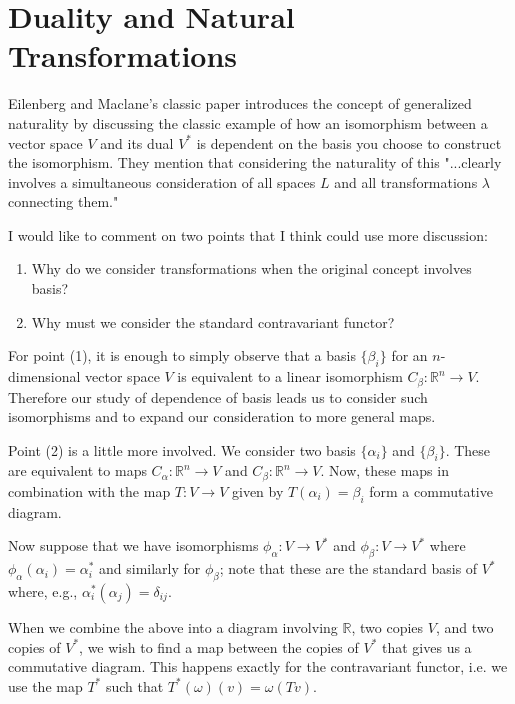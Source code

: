\section{Duality and Natural Transformations}

Eilenberg and Maclane's classic paper introduces the concept of generalized naturality by discussing 
the classic example of how an isomorphism between a vector space \(V\) and its dual \(V^*\) is dependent on
the basis you choose to construct the isomorphism. They mention that considering the naturality of this 
"...clearly involves a simultaneous consideration of all spaces \(L\) and all transformations \(\lambda\)
connecting them."

I would like to comment on two points that I think could use more discussion:
\begin{enumerate}
\item Why do we consider transformations when the original concept involves basis?
\item Why must we consider the standard contravariant functor?
\end{enumerate}

For point (1), it is enough to simply observe that a basis \(\{\beta_i\}\) for an \(n\)-dimensional vector space \(V\) is
equivalent to a linear isomorphism \(C_\beta: \mathbb R^n \to V\). Therefore our study of dependence of basis
leads us to consider such isomorphisms and to expand our consideration to more general maps.

Point (2) is a little more involved. We consider two basis \(\{\alpha_i\}\) and \(\{\beta_i\}\). These are 
equivalent to maps \(C_\alpha : \mathbb R^n \to V\) and \(C_\beta : \mathbb R^n \to V\). Now, these maps
in combination with the map \(T : V \to V\) given by \(T(\alpha_i) = \beta_i\) form a commutative diagram.

Now suppose that we have isomorphisms \(\phi_\alpha : V \to V^*\) and \(\phi_\beta : V \to V^*\) 
where \(\phi_\alpha(\alpha_i) = \alpha_i^*\) and similarly for \(\phi_\beta\); note that these
are the standard basis of \(V^*\) where, e.g., \(\alpha^*_i(\alpha_j) = \delta_{ij}\).

When we combine the above into a diagram involving \(\mathbb R\), two copies \(V\), and two copies of \(V^*\),
we wish to find a map between the copies of \(V^*\) that gives us a commutative diagram. This happens
exactly for the contravariant functor, i.e. we use the map \(T^*\) such that \(T^*(\omega)(v) = \omega(Tv)\).
